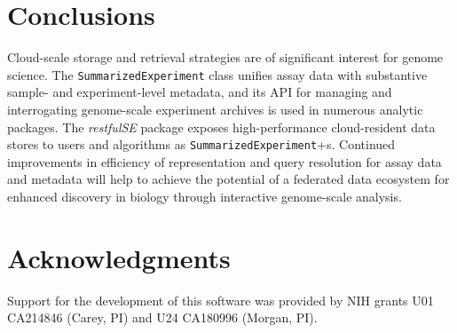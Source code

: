 \documentclass[applications]{gen-bioinformatics}
\newcommand{\Biocpackage}[1]{{\textit{#1}}}
\newcommand{\Rclass}[1]{{\texttt{#1}}}
\begin{document}
\section*{Conclusions}

Cloud-scale storage and retrieval strategies are of significant
interest for genome science.  
The \Rclass{SummarizedExperiment} class
unifies assay data with substantive sample- and experiment-level
metadata, and its API for managing and interrogating
genome-scale experiment archives is used in numerous
analytic packages.  
The \Biocpackage{restfulSE} package exposes high-performance
cloud-resident data stores to users and
algorithms as \texttt{SummarizedExperiment}+s.  Continued improvements
in efficiency of
representation and query resolution for assay data and metadata
will help to achieve the potential of a federated data ecosystem for
enhanced discovery in biology through interactive genome-scale analysis.



\section*{Acknowledgments}
Support for the development of this software was provided by NIH grants
U01 CA214846 (Carey, PI) and U24 CA180996 (Morgan, PI).


\end{document}
